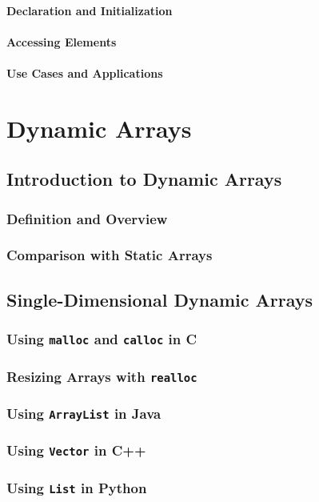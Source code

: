 \documentclass[12pt, oneside]{book}
\begin{document}
	\subsubsection{Declaration and Initialization}
	\subsubsection{Accessing Elements}
	\subsubsection{Use Cases and Applications}
\chapter{Dynamic Arrays}
	\section{Introduction to Dynamic Arrays}
	\subsection{Definition and Overview}
	\subsection{Comparison with Static Arrays}
	
	\section{Single-Dimensional Dynamic Arrays}
	\subsection{Using \texttt{malloc} and \texttt{calloc} in C}
	\subsection{Resizing Arrays with \texttt{realloc}}
	\subsection{Using \texttt{ArrayList} in Java}
	\subsection{Using \texttt{Vector} in C++}
	\subsection{Using \texttt{List} in Python}
	
\end{document}
